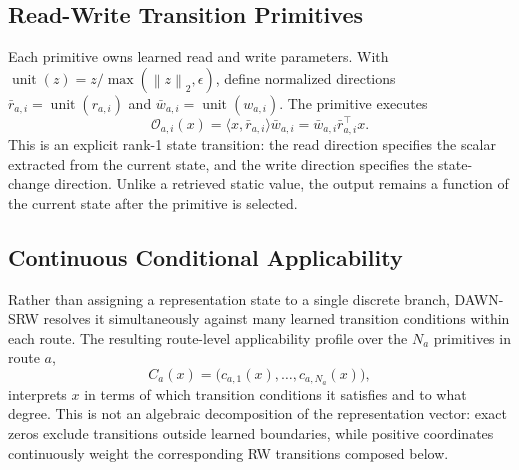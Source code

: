 \documentclass{article}
\newcommand{\norm}[1]{\left\lVert #1 \right\rVert}
\newcommand{\DAWN}{DAWN-SRW}
\newcommand{\op}{\mathcal{O}}
\begin{document}
\subsection{Read-Write Transition Primitives}
\label{sec:rw}

Each primitive owns learned read and write parameters. With
\(\operatorname{unit}(z)=z/\max(\norm{z}_2,\epsilon)\), define normalized
directions \(\bar r_{a,i}=\operatorname{unit}(r_{a,i})\) and
\(\bar w_{a,i}=\operatorname{unit}(w_{a,i})\). The primitive executes
\begin{equation}
\op_{a,i}(x)=\langle x,\bar r_{a,i}\rangle\bar w_{a,i}
=\bar w_{a,i}\bar r_{a,i}^{\top}x.
\label{eq:rw_operator}
\end{equation}
This is an explicit rank-1 state transition: the read direction specifies the
scalar extracted from the current state, and the write direction specifies the
state-change direction. Unlike a retrieved static value, the output remains a
function of the current state after the primitive is selected.

\subsection{Continuous Conditional Applicability}
\label{sec:applicability}

Rather than assigning a representation state to a single discrete branch,
\DAWN{} resolves it simultaneously against many learned transition conditions
within each route. The resulting route-level applicability profile over the
\(N_a\) primitives in route \(a\),
\begin{equation}
C_a(x)=\big(c_{a,1}(x),\ldots,c_{a,N_a}(x)\big),
\label{eq:applicability_profile}
\end{equation}
interprets \(x\) in terms of which transition conditions it satisfies and to
what degree. This is not an algebraic decomposition of the representation
vector: exact zeros exclude transitions outside learned boundaries, while
positive coordinates continuously weight the corresponding RW transitions
composed below.
\end{document}
